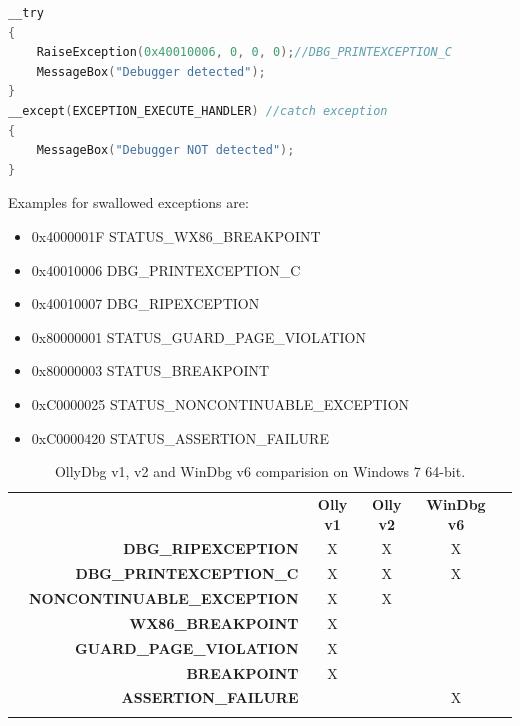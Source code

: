 \documentclass[10pt,a4paper]{article}
\begin{document}
\begin{lstlisting}[language=C, caption=Raise Exception Example]
__try
{
    RaiseException(0x40010006, 0, 0, 0);//DBG_PRINTEXCEPTION_C
    MessageBox("Debugger detected");
}
__except(EXCEPTION_EXECUTE_HANDLER) //catch exception
{
    MessageBox("Debugger NOT detected");
}
\end{lstlisting}

Examples for swallowed exceptions are:

\begin{itemize}
\item 0x4000001F STATUS\_WX86\_BREAKPOINT
\item 0x40010006 DBG\_PRINTEXCEPTION\_C
\item 0x40010007 DBG\_RIPEXCEPTION
\item 0x80000001 STATUS\_GUARD\_PAGE\_VIOLATION
\item 0x80000003 STATUS\_BREAKPOINT
\item 0xC0000025 STATUS\_NONCONTINUABLE\_EXCEPTION
\item 0xC0000420 STATUS\_ASSERTION\_FAILURE
\end{itemize}

\begin{table}[H]
\caption{OllyDbg v1, v2 and WinDbg v6 comparision on Windows 7 64-bit.}
\begin{tabular}{lrcccl}
 & \multicolumn{1}{c}{} & \textbf{Olly v1}    & \textbf{Olly v2}    & \textbf{WinDbg v6}    &  \\
 & \textbf{DBG\_RIPEXCEPTION}     & X                    & X                    & X                    &  \\
 & \textbf{DBG\_PRINTEXCEPTION\_C}      & X                    & X                    & X                    &  \\
 & \textbf{NONCONTINUABLE\_EXCEPTION}      & X                    & X                    &                     &  \\
 & \textbf{WX86\_BREAKPOINT}      & X                    &                     &                     &  \\
 & \textbf{GUARD\_PAGE\_VIOLATION}      & X                    &                     &                     &  \\
 & \textbf{BREAKPOINT}      & X                    &                     &                     &  \\
 & \textbf{ASSERTION\_FAILURE}      &                     &                     & X                    &  \\
 & \multicolumn{1}{l}{} & \multicolumn{1}{l}{} & \multicolumn{1}{l}{} & \multicolumn{1}{l}{} & 
\end{tabular}
\end{table}
\end{document}
